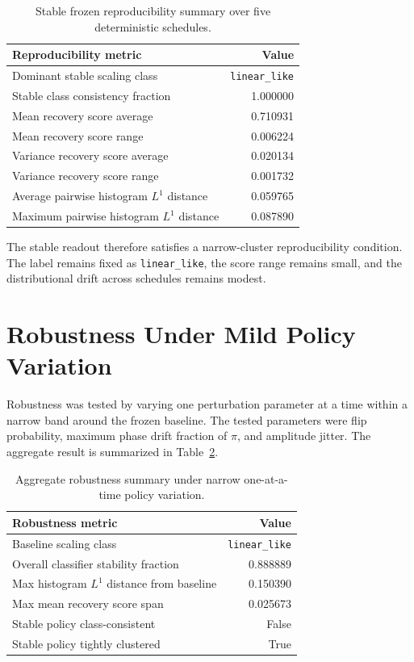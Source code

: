 \documentclass[11pt]{article}
\begin{document}
\begin{table}[t]
\centering
\small
\begin{tabular}{@{}lr@{}}
\toprule
Reproducibility metric & Value \\
\midrule
Dominant stable scaling class & \texttt{linear\_like} \\
Stable class consistency fraction & 1.000000 \\
Mean recovery score average & 0.710931 \\
Mean recovery score range & 0.006224 \\
Variance recovery score average & 0.020134 \\
Variance recovery score range & 0.001732 \\
Average pairwise histogram $L^1$ distance & 0.059765 \\
Maximum pairwise histogram $L^1$ distance & 0.087890 \\
\bottomrule
\end{tabular}
\caption{Stable frozen reproducibility summary over five deterministic schedules.}
\label{tab:repro}
\end{table}

The stable readout therefore satisfies a narrow-cluster reproducibility condition. The label remains fixed as \texttt{linear\_like}, the score range remains small, and the distributional drift across schedules remains modest.

\section{Robustness Under Mild Policy Variation}

Robustness was tested by varying one perturbation parameter at a time within a narrow band around the frozen baseline. The tested parameters were flip probability, maximum phase drift fraction of $\pi$, and amplitude jitter. The aggregate result is summarized in Table~\ref{tab:robustness}.

\begin{table}[t]
\centering
\small
\begin{tabular}{@{}lr@{}}
\toprule
Robustness metric & Value \\
\midrule
Baseline scaling class & \texttt{linear\_like} \\
Overall classifier stability fraction & 0.888889 \\
Max histogram $L^1$ distance from baseline & 0.150390 \\
Max mean recovery score span & 0.025673 \\
Stable policy class-consistent & False \\
Stable policy tightly clustered & True \\
\bottomrule
\end{tabular}
\caption{Aggregate robustness summary under narrow one-at-a-time policy variation.}
\label{tab:robustness}
\end{table}
\end{document}
